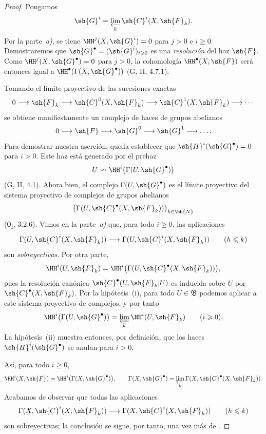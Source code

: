 \documentclass[oneside]{amsart}
\renewcommand{\leq}{\leqslant}
\renewcommand{\geq}{\geqslant}
\newcommand{\EGAUnavailableHyperref}[2]{#2}
\begin{document}
\begin{proof}
Pongamos
\[
  \sh{G}^i=\varprojlim_k\sh{C}^i(X,\sh{F}_k).
\]
Por la parte~\emph{a)}, se tiene
$\HH^j(X,\sh{G}^i)=0$ para $j>0$ e $i\geq0$.
Demostraremos que
$\sh{G}^\bullet=(\sh{G}^i)_{i\geq0}$ es una \emph{resolución} del haz
$\sh{F}$. Como $\HH^j(X,\sh{G}^\bullet)=0$ para $j>0$, la cohomología
$\HH^\bullet(X,\sh{F})$ será entonces igual a
$\HH^\bullet(\Gamma(X,\sh{G}^\bullet))$ (G, II, 4.7.1).

Tomando el límite proyectivo de las sucesiones exactas
\[
  0\longrightarrow\sh{F}_k
  \longrightarrow\sh{C}^0(X,\sh{F}_k)
  \longrightarrow\sh{C}^1(X,\sh{F}_k)
  \longrightarrow\cdots
\]
se obtiene manifiestamente un complejo de haces de grupos abelianos
\[
  0\longrightarrow\sh{F}
  \longrightarrow\sh{G}^0
  \longrightarrow\sh{G}^1
  \longrightarrow\ldots.
\]
Para demostrar nuestra aserción, queda establecer que
$\sh{H}^i(\sh{G}^\bullet)=0$ para $i>0$.
Este haz está generado por el prehaz
\[
  U\leadsto\HH^i\bigl(\Gamma(U,\sh{G}^\bullet)\bigr)
\]
(G, II, 4.1).
Ahora bien, el complejo $\Gamma(U,\sh{G}^\bullet)$ es el límite proyectivo
del sistema proyectivo de complejos de grupos abelianos
\[
  \bigl(\Gamma(U,\sh{C}^\bullet(X,\sh{F}_k))\bigr)_{k\in\bb{N}}
\]
(\textbf{0}\textsubscript{I}, \EGAUnavailableHyperref{0.3.2.6}{3.2.6}).
Vimos en la parte~\emph{a)} que, para todo $i\geq0$, las aplicaciones
\[
  \Gamma(U,\sh{C}^i(X,\sh{F}_k))
  \longrightarrow
  \Gamma(U,\sh{C}^i(X,\sh{F}_h))
  \qquad(h\leq k)
\]
son \emph{sobreyectivas}. Por otra parte,
\[
  \HH^i(U,\sh{F}_k)
  =
  \HH^i\bigl(\Gamma(U,\sh{C}^\bullet(X,\sh{F}_k))\bigr),
\]
pues la resolución canónica $\sh{C}^\bullet(U,\sh{F}_k|U)$ es
inducida sobre $U$ por $\sh{C}^\bullet(X,\sh{F}_k)$.
Por la hipótesis~{\rm(i)}, para todo $U\in\mathfrak{B}$ podemos aplicar
 a este sistema proyectivo de complejos, y por tanto
\[
  \HH^i\bigl(\Gamma(U,\sh{G}^\bullet)\bigr)
  =
  \varprojlim_k\HH^i(U,\sh{F}_k)
  \qquad(i\geq0).
\]
La hipótesis~{\rm(ii)} muestra entonces, por definición, que los haces
$\sh{H}^i(\sh{G}^\bullet)$ se anulan para $i>0$.

Así, para todo $i\geq0$,
\[
  \HH^i(X,\sh{F})
  =
  \HH^i\bigl(\Gamma(X,\sh{G}^\bullet)\bigr),
  \qquad
  \Gamma(X,\sh{G}^\bullet)
  =
  \varprojlim_k\Gamma(X,\sh{C}^\bullet(X,\sh{F}_k)).
\]
Acabamos de observar que todas las aplicaciones
\[
  \Gamma(X,\sh{C}^i(X,\sh{F}_k))
  \longrightarrow
  \Gamma(X,\sh{C}^i(X,\sh{F}_h))
  \qquad(h\leq k)
\]
son sobreyectivas; la conclusión se sigue, por tanto, una vez más de
.
\end{proof}
\end{document}
